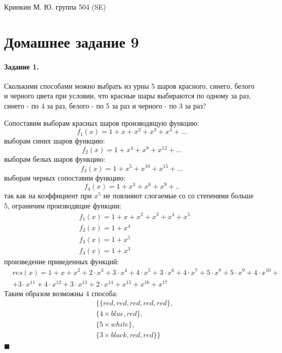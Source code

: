\documentclass[a4paper,12pt]{article}
\begin{document}
\sloppy

\lstset{
	basicstyle=\small,
	stringstyle=\ttfamily,
	showstringspaces=false,
	columns=fixed,
	breaklines=true,
	numbers=right,
	numberstyle=\tiny
}

\newtheorem{Def}{Определение}[section]
\newtheorem{Th}{Теорема}
\newtheorem{Lem}[Th]{Лемма}
\newenvironment{Proof}
	{\par\noindent{\bf Доказательство.}}
	{\hfill$\scriptstyle\blacksquare$}
\newenvironment{Solution}
	{\par\noindent{\bf Решение.}}
	{\hfill$\scriptstyle\blacksquare$}


\begin{flushright}
	Кринкин М. Ю. группа 504 (SE)
\end{flushright}

\section{Домашнее задание 9}

\paragraph{Задание 1.} Сколькими способами можно выбрать из урны 5 шаров красного, синего, белого и черного цвета при условии, что красные шары выбираются по одному за раз, синего - по 4 за раз, белого - по 5 за раз и черного - по 3 за раз?

\begin{Solution}
Сопоставим выборам красных шаров производящую функцию:
\[
	f_1\left(x\right) = 1+x+x^2+x^3+x^4+...
\]
выборам синих шаров функцию:
\[
	f_2\left(x\right) = 1+x^4+x^8+x^{12}+...
\]
выборам белых шаров функцию:
\[
	f_3\left(x\right) = 1+x^5+x^{10}+x^{15}+...
\]
выборам черных сопоставим функцию:
\[
	f_4\left(x\right) = 1+x^3+x^6+x^9+..
\]
так как на коэффициент при $x^5$ не повлияют слогаемые со со степенями больше 5, ограничим производящие функции:
\[
	\begin{split}
		& f_1\left(x\right)=1+x+x^2+x^3+x^4+x^5 \\
		& f_2\left(x\right)=1+x^4 \\
		& f_3\left(x\right)=1+x^5 \\
		& f_4\left(x\right)=1+x^3
	\end{split}
\]
произведение приведенных функций:
\[
	\begin{split}
		&res\left(x\right) = 1+x+x^2+2\cdot x^3+3\cdot x^4+4\cdot x^5+3\cdot x^6+4\cdot x^7+5\cdot x^8+5\cdot x^9+4\cdot x^{10}+\\
		&+3\cdot x^{11}+4\cdot x^{12}+3\cdot x^{13}+2\cdot x^{14}+x^{15}+x^{16}+x^{17}
	\end{split}
\]
Таким образом возможны 4 способа:
\[
	\begin{split}
		& \{\{red,red,red,red,red\},\\
		& \{4 \times blue, red\},\\
		& \{5 \times white\},\\
		& \{3 \times black, red, red\}\}
	\end{split}
\]
\end{Solution}
\end{document}
